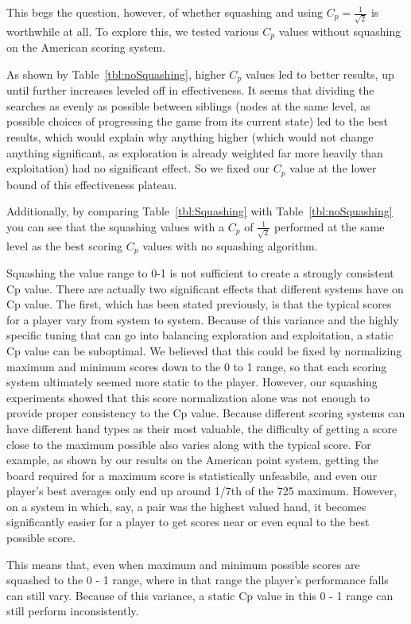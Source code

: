 \documentclass[letterpaper]{article}
\begin{document}
This begs the question, however, of whether squashing and using $C_p = \frac{1}{\sqrt{2}}$ is worthwhile at all. To explore this, we tested various $C_p$ values without squashing on the American scoring system.

As shown by  Table~\ref{tbl:noSquashing}, higher $C_p$ values  led to better results, up until further increases leveled off in effectiveness. It seems that dividing the searches as evenly as possible between siblings (nodes at the same level, as possible choices of progressing the game from its current state) led to the best results, which would explain why anything higher (which would not change anything significant, as exploration is already weighted far more heavily than exploitation) had no significant effect. So we fixed our $C_p$ value at the lower bound of this effectiveness plateau.

Additionally, by comparing Table~\ref{tbl:Squashing} with  Table~\ref{tbl:noSquashing} you can see that the squashing values with a  
$C_p$ of $\frac{1}{\sqrt{2}}$ performed at the same level as the best scoring  $C_p$ values with no squashing algorithm. 

Squashing the value range to 0-1 is not sufficient to create a strongly consistent Cp value. There are actually two significant effects that different systems have on Cp value. The first, which has been stated previously, is that the typical scores for a player vary from system to system. Because of this variance and the highly specific tuning that can go into balancing exploration and exploitation, a static Cp value can be suboptimal. We believed that this could be fixed by normalizing maximum and minimum scores down to the 0 to 1 range, so that each scoring system ultimately seemed more static to the player. However, our squashing experiments showed that this score normalization alone was not enough to provide proper consistency to the Cp value. Because different scoring systems can have different hand types as their most valuable, the difficulty of getting a score close to the maximum possible also varies along with the typical score. For example, as shown by our results on the American point system, getting the board required for a maximum score is statistically unfeasbile, and even our player's best averages only end up around 1/7th of the 725 maximum. However, on a system in which, say, a pair was the highest valued hand, it becomes significantly easier for a player to get scores near or even equal to the best possible score.

This means that, even when maximum and minimum possible scores are squashed to the 0 - 1 range, where in that range the player's performance falls can still vary. Because of this variance, a static Cp value in this 0 - 1 range can still perform inconsistently.
\end{document}
